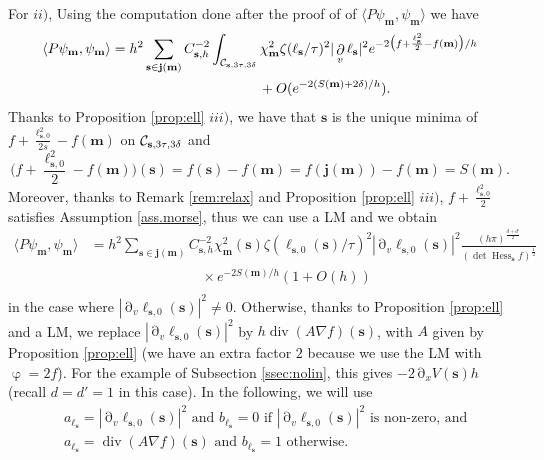 \documentclass[12pt]{amsart}
\newcommand{\Hess}{\operatorname{Hess}}
\renewcommand{\div}{\operatorname{div}}
\def\<{\langle}
\def\>{\rangle}
\numberwithin{equation}{section}
\numberwithin{figure}{section}
\def\m{\mathbf{m}}
\def\s{\mathbf{s}}
\def\j{\mathbf{j}}
\DeclareMathOperator{\p}{\partial}
\DeclareMathOperator{\phii}{\varphi}
\begin{document}
For $ii)$, Using the computation done after the proof of \cite[Proposition 5.1 $i)$]{BoLePMi22} of $\<P\psi_\m,\psi_\m\>$ we have 
\begin{equation*}
\begin{aligned}
    \<P\psi_\m,\psi_\m\> &= h^2\sum_{\s\in\j(\m)}C_{\s,h}^{-2}\int_{\ccc_{\s,3\tau,3\delta}}\chi_\m^2\zeta(\ell_\s/\tau)^2|\p_v\ell_\s|^2e^{-2\big(f+\frac{\ell_\s^{2}}{2}-f(\m)\big)/h}\\&\phantom{***************}+O(e^{-2(S(\m)+2\delta)/h}).
\end{aligned}
\end{equation*}
Thanks to Proposition \ref{prop:ell} $iii)$, we have that $\s$ is the unique minima of $f+\frac{\ell^{2}_{\s,0}}{2s}-f(\m)$ on $\ccc_{\s,3\tau,3\delta}$ and
\begin{equation*}
\big(f+\frac{\ell^{2}_{\s,0}}{2}-f(\m)\big)(\s) = f(\s) - f(\m) = f(\j(\m)) - f(\m) = S(\m).
\end{equation*}
Moreover, thanks to Remark \ref{rem:relax} and Proposition \ref{prop:ell} $iii)$, $f+\frac{\ell^{2}_{\s,0}}{2}$ satisfies Assumption \ref{ass.morse}, thus we can use a LM and we obtain
\begin{equation*}
\begin{aligned}
    \<P\psi_\m,\psi_\m\> &= h^2\sum_{\s\in\j(\m)}C_{\s,h}^{-2}\chi_\m^2(\s)\zeta(\ell_{\s,0}(\s)/\tau)^2|\p_v\ell_{\s,0}(\s)|^2\frac{(h\pi)^{\frac {d+d'}2}}{(\det\Hess_\s f)^{\frac12}}\\
    &\phantom{************}\times e^{-2S(\m)/h}(1+O(h))\\
\end{aligned}
\end{equation*}
in the case where $|\p_v\ell_{\s,0}(\s)|^2\neq0$. Otherwise, thanks to Proposition \ref{prop:ell} and a LM, we replace $|\p_v\ell_{\s,0}(\s)|^2$ by $h\div(A\nabla f)(\s)$, with $A$ given by Proposition \ref{prop:ell} (we have an extra factor $2$ because we use the LM with $\phii = 2f$). For the example of Subsection \ref{ssec:nolin}, this gives $-{2}{\p_xV(\s)}h$ (recall $d=d'=1$ in this case). In the following, we will use
\begin{equation}\label{eq:defab}
\begin{aligned}
    &a_{\ell_\s} = |\p_v\ell_{\s,0}(\s)|^2 \text{ and } b_{\ell_\s} = 0 \text{ if } |\p_v\ell_{\s,0}(\s)|^2 \text{ is non-zero, and}\\
    &a_{\ell_\s} = \div(A\nabla f)(\s) \text{ and } b_{\ell_\s} = 1 \text{ otherwise.}
\end{aligned}
\end{equation}
\end{document}
